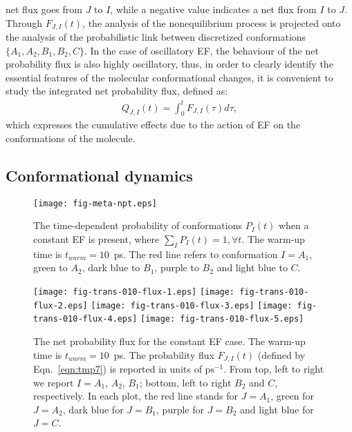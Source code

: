 \documentclass[a4paper,preprint,unsortedaddress,onecolumn]{revtex4-1}
\begin{document}
net flux goes from $J$ to $I$,
while a negative value indicates a net flux from $I$ to $J$.
Through $F_{J,I}(t)$, the analysis of the nonequilibrium process 
is projected onto the analysis of the probabilistic link between discretized conformations $\{A_1, A_2, B_1, B_2, C\}$.
In the case of oscillatory EF, the behaviour of the net probability flux is also highly oscillatory, thus, in order to clearly identify the essential features of the molecular conformational changes, it is convenient to study the integrated net probability flux, defined as:
\begin{align}\label{eqn:tmp7a}
  Q_{J,I} (t) = \int_0^t F_{J,I}(\tau)d \tau,
\end{align}
which expresses the cumulative effects due to the action of EF on the conformations of the molecule.





\subsection{Conformational dynamics}


\begin{figure}
  \centering
  \texttt{[image: fig-meta-npt.eps]}
  \caption{The time-dependent probability of conformations $P_I(t)$ 
    when a constant EF is present, where $\sum_I P_I(t) = 1, \forall t$.
    The warm-up time is $t_{warm} = 10$~ps. The red line refers to conformation $I = A_1$,
    green to $A_2$, dark blue to $B_1$, purple to $B_2$ and light blue
    to $C$. 
  }
  \label{fig:tmp5}
\end{figure}

\begin{figure}
  \centering
  \texttt{[image: fig-trans-010-flux-1.eps]}
  \texttt{[image: fig-trans-010-flux-2.eps]}
  \texttt{[image: fig-trans-010-flux-3.eps]}
  \texttt{[image: fig-trans-010-flux-4.eps]}
  \texttt{[image: fig-trans-010-flux-5.eps]}
  \caption{
    The net probability flux for the constant EF case.
    The warm-up time is $t_{warm} = 10$~ps.
    The probability flux $F_{J,I}(t)$ (defined by Eqn.~\eqref{eqn:tmp7}) is reported in units of $\textrm{ps}^{-1}$.
    From top, left to right we report $I = A_1$, $A_2$, $B_1$; bottom, left to right $B_2$ and
    $C$, respectively. In each plot, the red line stands for $J=A_1$,
    green for $J=A_2$, dark blue for $J=B_1$, purple for $J=B_2$ and light blue
    for $J=C$.
    }
  \label{fig:tmp6}
\end{figure}
\end{document}
